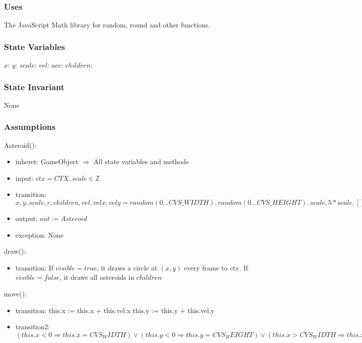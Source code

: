 \documentclass[12pt]{article}
\begin{document}
\subsubsection* {Uses}

The JavaScript Math library for random, round and other functions.

\subsubsection* {State Variables}

$x$:
$y$:
$scale$:
$vel$:
$acc$:
$children$:

\subsubsection* {State Invariant}

None

\subsubsection* {Assumptions}

Asteroid():
\begin{itemize}
    \item inheret: GameObject $\Rightarrow$ All state variables and methods
    \item input: $ctx = CTX, scale \in \mathbb{Z}$
    \item transition: $ x, y, scale, r, children, vel, velx, vely = random(0...CVS\_WIDTH), random(0...CVS\_HEIGHT), scale, 5*scale, [],
    random(-1...1) * 3,
    random(-1...1) * 3$
    \item output: $out := Asteroid$
    \item exception: None
\end{itemize}

draw():
\begin{itemize}
  \item transition: If $visible = true$, it draws a circle at $(x,y)$ every frame to $ctx$. If $visible = false$, it draws all asteroids in $children$
\end{itemize}

move():
\begin{itemize}
  \item transition: this.x := this.x + this.vel.x \land this.y := this.y + this.vel.y
  \item transition2: $(this.x < 0 \Rightarrow this.x = CVS_WIDTH) \lor (this.y < 0 \Rightarrow this.y = CVS_HEIGHT) \lor (this.x > CVS_WIDTH \Rightarrow this.x = 0) \lor (this.y > CVS_HEIGHT \Rightarrow this.y = 0)$
\end{itemize}
\end{document}
